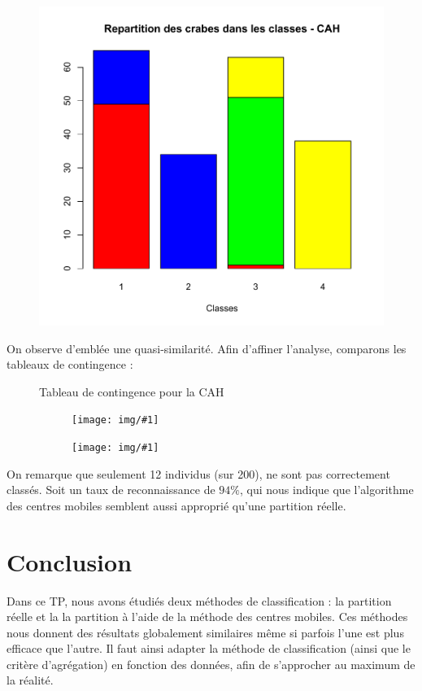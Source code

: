 \documentclass[a4paper,11pt]{article}
\newcommand{\InsertFig}[1]{
\begin{figure}[H]
\begin{center}
\texttt{[image: img/\#1]}
\end{center}
\end{figure}}
\begin{document}
\begin{figure}[H]
\begin{center}
\includegraphics[width=.55\textwidth]{img/crabscah}
\end{center}
\end{figure}


\noindent On observe d'emblée une quasi-similarité. Afin d'affiner l'analyse, comparons les tableaux de contingence :

\begin{figure}[H]

  \begin{minipage}[b]{0.3\linewidth}
   \centering
   \caption{Tableau de contingence pour la CAH}
   \InsertFig{contigencearbrecrabs} 
  \end{minipage}
\hfill
  \begin{minipage}[b]{0.3\linewidth}
   \centering
   \caption{Tableau de contingence pour l'algorithme des centres mobiles}
  \InsertFig{contingencekmcrabs}     
  \end{minipage}

  \label{fig:ma_fig}

\end{figure}

\noindent On remarque que seulement 12 individus (sur 200), ne sont pas correctement classés. Soit un taux de reconnaissance de $94\%$, qui nous indique que l'algorithme des centres mobiles semblent aussi approprié qu'une partition réelle.

\section{Conclusion}

\noindent Dans ce TP, nous avons étudiés deux méthodes de classification : la partition réelle et la la partition à l'aide de la méthode des centres mobiles. Ces méthodes nous donnent des résultats globalement similaires même si parfois l'une est plus efficace que l'autre. Il faut ainsi adapter la méthode de classification (ainsi que le critère d'agrégation) en fonction des données, afin de s'approcher au maximum de la réalité.
\end{document}
